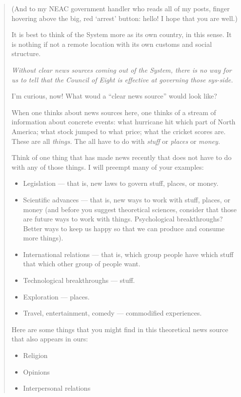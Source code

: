 \begin{quote}
(And to my NEAC government handler who reads all of my posts, finger hovering above the big, red `arrest' button: hello! I hope that you are well.)

It is best to think of the System more as its own country, in this sense. It is nothing if not a remote location with its own customs and social structure.

\emph{Without clear news sources coming out of the System, there is no way for us to tell that the Council of Eight is effective at governing those sys-side.}

I'm curious, now! What woud a ``clear news source'' would look like?

When one thinks about news sources here, one thinks of a stream of information about concrete events: what hurricane hit which part of North America; what stock jumped to what price; what the cricket scores are. These are all \emph{things.} The all have to do with \emph{stuff} or \emph{places} or \emph{money.}

Think of one thing that has made news recently that does not have to do with any of those things. I will preempt many of your examples:

\begin{itemize}
\tightlist
\item
  Legislation — that is, new laws to govern stuff, places, or money.
\item
  Scientific advances — that is, new ways to work with stuff, places, or money (and before you suggest theoretical sciences, consider that those are future ways to work with things. Psychological breakthroughs? Better ways to keep us happy so that we can produce and consume more things).
\item
  International relations — that is, which group people have which stuff that which other group of people want.
\item
  Technological breakthroughs — stuff.
\item
  Exploration — places.
\item
  Travel, entertainment, comedy — commodified experiences.
\end{itemize}

Here are some things that you might find in this theoretical news source that also appears in ours:

\begin{itemize}
\tightlist
\item
  Religion
\item
  Opinions
\item
  Interpersonal relations
\end{itemize}


\end{quote}
